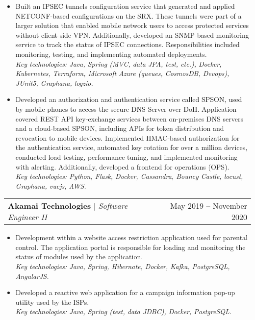 \documentclass[letterpaper,11pt]{article}
\makeatletter
\newcommand{\resumeProjectHeading}[2]{
    \item
    \begin{tabular*}{0.97\textwidth}{l@{\extracolsep{\fill}}r}
      \small#1 & #2 \\
    \end{tabular*}\vspace{-7pt}
}
\makeatother
\begin{document}
          {\small{
            \begin{itemize}                
                \item \justifying Built an IPSEC tunnels configuration service that generated and applied NETCONF-based configurations on the SRX. These tunnels were part of a larger solution that enabled mobile network users to access protected services without client-side VPN. Additionally, developed an SNMP-based monitoring service to track the status of IPSEC connections. Responsibilities included monitoring, testing, and implementing automated deployments. \\
                \textit{Key technologies: Java, Spring (MVC, data JPA, test, etc.), Docker, Kubernetes, Terraform, Microsoft Azure (queues, CosmosDB, Devops), JUnit5, Graphana, logzio.}

                \item Developed an authorization and authentication service called SPSON, used by mobile phones to access the secure DNS Server over DoH. Application covered REST API key-exchange services between on-premises DNS servers and a cloud-based SPSON, including APIs for token distribution and revocation to mobile devices. Implemented HMAC-based authorization for the authentication service, automated key rotation for over a million devices, conducted load testing, performance tuning, and implemented monitoring with alerting. Additionally, developed a frontend for operations (OPS). \\
                \textit{Key technologies: Python, Flask, Docker, Cassandra, Bouncy Castle, locust, Graphana, vuejs, AWS.}
            \end{itemize}
 
            }
          }
          
          \resumeProjectHeading
          {\textbf{Akamai Technologies} $|$ \footnotesize\emph{Software Engineer II}\vspace{8pt}}{May 2019 -- November 2020}
          {\small{
            \begin{itemize}
                \item \justifying
Development within a website access restriction application used for parental control. The application portal is responsible for loading and monitoring the status of modules used by the application. \\
                 \textit{Key technologies: Java, Spring, Hibernate, Docker, Kafka, PostgreSQL, AngularJS.}
                \item \justifying Developed a reactive web application for a campaign information pop-up utility used by the ISPs. \\ 
                \textit{Key technologies: Java, Spring (test, data JDBC), Docker, PostgreSQL.}
            \end{itemize}
            }
            }
\end{document}
